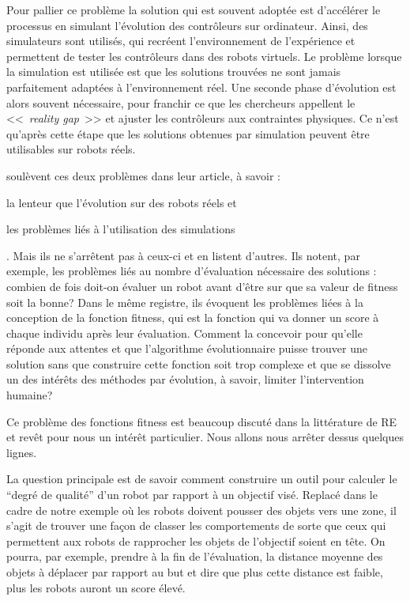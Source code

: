 Pour pallier ce problème la solution qui est souvent adoptée est d'accélérer le processus en simulant l'évolution des contrôleurs sur ordinateur. Ainsi, des simulateurs sont utilisés, qui recréent l'environnement de l'expérience et permettent de tester les contrôleurs dans des robots virtuels. Le problème lorsque la simulation est utilisée est que les solutions trouvées ne sont jamais parfaitement adaptées à l'environnement réel. Une seconde phase d'évolution est alors souvent nécessaire, pour franchir ce que les chercheurs appellent le <<~\emph{reality gap}~>> et ajuster les contrôleurs aux contraintes physiques. Ce n'est qu'après cette étape que les solutions obtenues par simulation peuvent être utilisables sur robots réels.

\cite{mataric96challengesinevolvingcontrollersforphysicalrobots} soulèvent ces deux problèmes dans leur article, à savoir :
\begin{inparaenum}
\item la lenteur que l'évolution sur des robots réels et 
\item les problèmes liés à l'utilisation des simulations
\end{inparaenum}. Mais ils ne s'arrêtent pas à ceux-ci et en listent d'autres. Ils notent, par exemple, les problèmes liés au nombre d'évaluation nécessaire des solutions : combien de fois doit-on évaluer un robot avant d'être sur que sa valeur de fitness soit la bonne? Dans le même registre, ils évoquent les problèmes liées à la conception de la fonction fitness, qui est la fonction qui va donner un score à chaque individu après leur évaluation. Comment la concevoir pour qu'elle réponde aux attentes et que l'algorithme évolutionnaire puisse trouver une solution sans que construire cette fonction soit trop complexe et que se dissolve un des intérêts des méthodes par évolution, à savoir, limiter l'intervention humaine? 

Ce problème des fonctions fitness est beaucoup discuté dans la littérature de RE et revêt pour nous un intérêt particulier. Nous allons nous arrêter dessus quelques lignes. 

La question principale est de savoir comment construire un outil pour calculer le ``degré de qualité'' d'un robot par rapport à un objectif visé. Replacé dans le cadre de notre exemple où les robots doivent pousser des objets vers une zone, il s'agit de trouver une façon de classer les comportements de sorte que ceux qui permettent aux robots de rapprocher les objets de l'objectif soient en tête. On pourra, par exemple, prendre à la fin de l'évaluation, la distance moyenne des objets à déplacer par rapport au but et dire que plus cette distance est faible, plus les robots auront un score élevé. 

